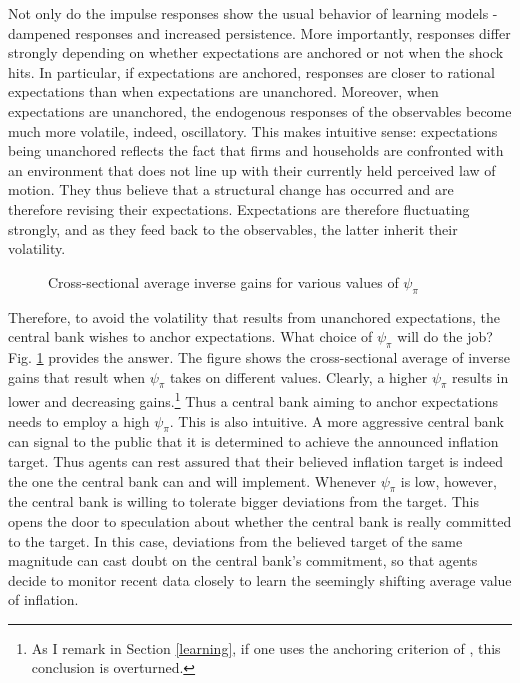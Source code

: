 \documentclass[11pt]{article}
\def \myFigPath {../../figures/}
\renewcommand{\[}{\begin{equation}}
\renewcommand{\]}{\end{equation}}
\def\mySmallerFigScale{0.18}
\begin{document}
Not only do the impulse responses show the usual behavior of learning models - dampened responses and increased persistence. More importantly, responses differ strongly depending on whether expectations are anchored or not when the shock hits. In particular, if expectations are anchored, responses are closer to rational expectations than when expectations are unanchored. Moreover, when expectations are unanchored, the endogenous responses of the observables become much more volatile, indeed, oscillatory. This makes intuitive sense: expectations being unanchored reflects the fact that firms and households are confronted with an environment that does not line up with their currently held perceived law of motion. They thus believe that a structural change has occurred and are therefore revising their expectations. Expectations are therefore fluctuating strongly, and as they feed back to the observables, the latter inherit their volatility. 

\begin{figure}[h!]
\caption{Cross-sectional average inverse gains for various values of $\psi_{\pi}$}
\floatfoot{}
\label{anchor_psi}
\end{figure}
Therefore, to avoid the volatility that results from unanchored expectations, the central bank wishes to anchor expectations. What choice of $\psi_{\pi}$ will do the job? Fig. \ref{anchor_psi} provides the answer. The figure shows the cross-sectional average of inverse gains that result when $\psi_{\pi}$ takes on different values. Clearly, a higher $\psi_{\pi}$ results in lower and decreasing gains.\footnote{As I remark in Section \ref{learning}, if one uses the anchoring criterion of \cite{carvalho2019anchored}, this conclusion is overturned.} Thus a central bank aiming to anchor expectations needs to employ a high $\psi_{\pi}$. This is also intuitive. A more aggressive central bank can signal to the public that it is determined to achieve the announced inflation target. Thus agents can rest assured that their believed inflation target is indeed the one the central bank can and will implement. Whenever $\psi_{\pi}$ is low, however, the central bank is willing to tolerate bigger deviations from the target. This opens the door to speculation about whether the central bank is really committed to the target. In this case, deviations from the believed target of the same magnitude can cast doubt on the central bank's commitment, so that agents decide to monitor recent data closely to learn the seemingly shifting average value of inflation.
\end{document}
